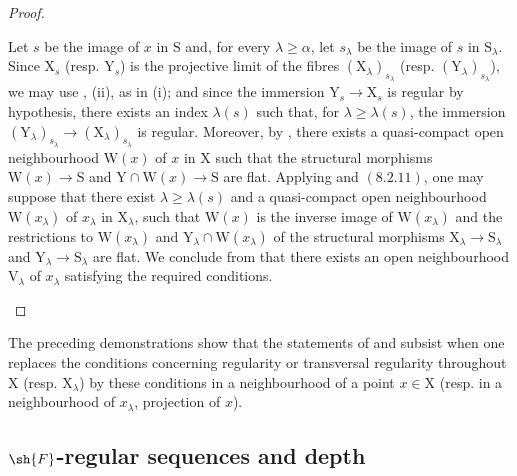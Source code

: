 \begin{proof}
\begin{enumerate}
Let $s$ be the image of $x$ in $\mathrm{S}$ and, for every $\lambda\geqslant\alpha$, let $s_\lambda$ be the image of $s$ in $\mathrm{S}_\lambda$. Since $\mathrm{X}_s$ (resp. $\mathrm{Y}_s$) is the projective limit of the fibres $(\mathrm{X}_\lambda)_{s_\lambda}$ (resp. $(\mathrm{Y}_\lambda)_{s_\lambda}$), we may use , (ii), as in (i); and since the immersion $\mathrm{Y}_s\to\mathrm{X}_s$ is regular by hypothesis, there exists an index $\lambda(s)$ such that, for $\lambda\geqslant\lambda(s)$, the immersion $(\mathrm{Y}_\lambda)_{s_\lambda}\to(\mathrm{X}_\lambda)_{s_\lambda}$ is regular. Moreover, by , there exists a quasi-compact open neighbourhood $\mathrm{W}(x)$ of $x$ in $\mathrm{X}$ such that the structural morphisms $\mathrm{W}(x)\to\mathrm{S}$ and $\mathrm{Y}\cap\mathrm{W}(x)\to\mathrm{S}$ are flat. Applying  and $(8.2.11)$, one may suppose that there exist $\lambda\geqslant\lambda(s)$ and a quasi-compact open neighbourhood $\mathrm{W}(x_\lambda)$ of $x_\lambda$ in $\mathrm{X}_\lambda$, such that $\mathrm{W}(x)$ is the inverse image of $\mathrm{W}(x_\lambda)$ and the restrictions to $\mathrm{W}(x_\lambda)$ and $\mathrm{Y}_\lambda\cap\mathrm{W}(x_\lambda)$ of the structural morphisms $\mathrm{X}_\lambda\to\mathrm{S}_\lambda$ and $\mathrm{Y}_\lambda\to\mathrm{S}_\lambda$ are flat. We conclude from  that there exists an open neighbourhood $\mathrm{V}_\lambda$ of $x_\lambda$ satisfying the required conditions.
\end{enumerate}
\end{proof}

\begin{remark}[19.8.3]
\label{IV.19.8.3}
The preceding demonstrations show that the statements of  and  subsist when one replaces the conditions concerning regularity or transversal regularity throughout $\mathrm{X}$ (resp. $\mathrm{X}_\lambda$) by these conditions in a neighbourhood of a point $x\in\mathrm{X}$ (resp. in a neighbourhood of $x_\lambda$, projection of $x$).
\end{remark}

\subsection{\texorpdfstring{$\sh{F}$}{F}-regular sequences and depth}
\label{subsection:IV.19.9}
\label{IV.19.9}


